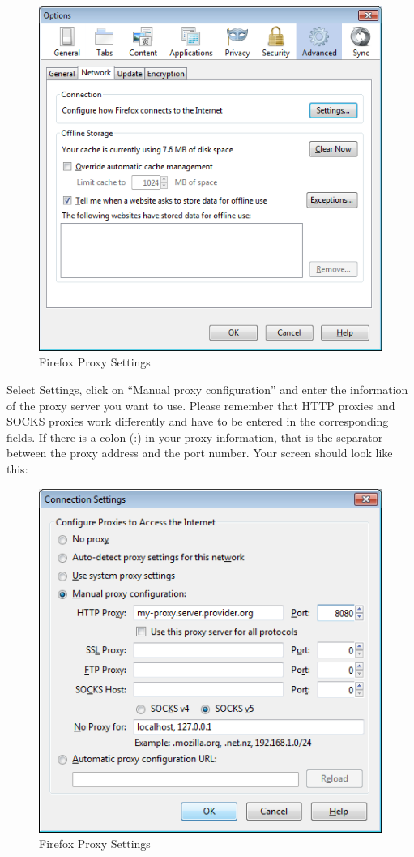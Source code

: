 \begin{figure}[htbp]
\centering
\includegraphics{ff_proxy_1.png}
\caption{Firefox Proxy Settings}
\end{figure}

Select Settings, click on ``Manual proxy configuration'' and enter the
information of the proxy server you want to use. Please remember that
HTTP proxies and SOCKS proxies work differently and have to be entered
in the corresponding fields. If there is a colon (:) in your proxy
information, that is the separator between the proxy address and the
port number. Your screen should look like this:

\begin{figure}[htbp]
\centering
\includegraphics{ff_proxy_2.png}
\caption{Firefox Proxy Settings}
\end{figure}

